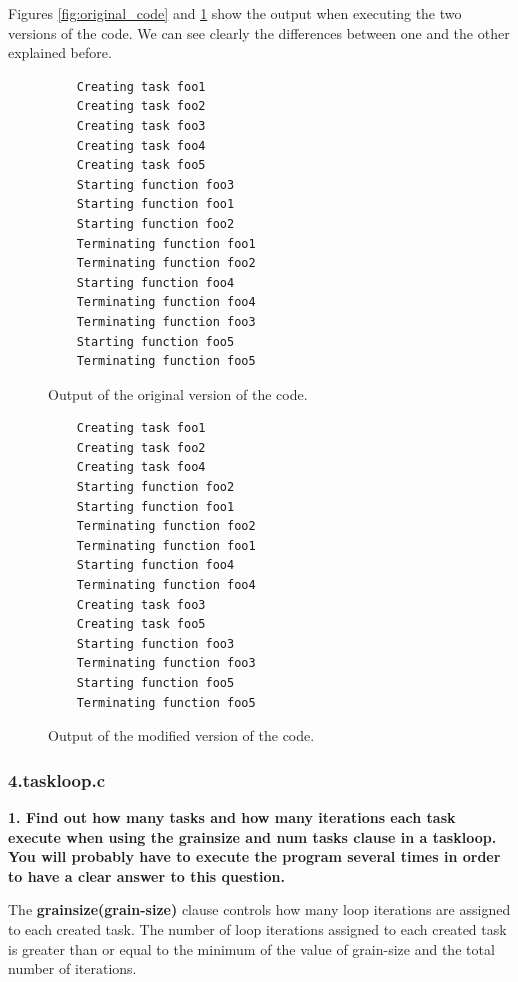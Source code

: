 \documentclass[12pt, a4paper]{article}
\begin{document}
Figures \ref{fig:original_code} and \ref{fig:modified_code} show the output when executing the two versions of the code. We can see clearly the differences between one and the other explained before.

\begin{figure}[H]
\begin{minipage}[b]{0.47\linewidth}

\begin{lstlisting}
	Creating task foo1
	Creating task foo2
	Creating task foo3
	Creating task foo4
	Creating task foo5
	Starting function foo3
	Starting function foo1
	Starting function foo2
	Terminating function foo1
	Terminating function foo2
	Starting function foo4
	Terminating function foo4
	Terminating function foo3
	Starting function foo5
	Terminating function foo5
\end{lstlisting}

\caption{Output of the original version of the code.}
\label{fig:original_code}
\end{minipage}
\hspace{0.5cm}
\begin{minipage}[b]{0.48\linewidth}

\begin{lstlisting}
	Creating task foo1
	Creating task foo2
	Creating task foo4
	Starting function foo2
	Starting function foo1
	Terminating function foo2
	Terminating function foo1
	Starting function foo4
	Terminating function foo4
	Creating task foo3
	Creating task foo5
	Starting function foo3
	Terminating function foo3
	Starting function foo5
	Terminating function foo5
\end{lstlisting}

\caption{Output of the modified version of the code.}
\label{fig:modified_code}
\end{minipage}
\end{figure}

\subsubsection{4.taskloop.c}

\textbf{1. Find out how many tasks and how many iterations each task execute when using the grainsize and num tasks clause in a taskloop. You will probably have to execute the program several times in order to have a clear answer to this question.}

The \textbf{grainsize(grain-size)} clause controls how many loop iterations are assigned to each created task. The number of loop iterations assigned to each created task is greater than or equal to the minimum of the value of grain-size and the total number of iterations.
\end{document}
